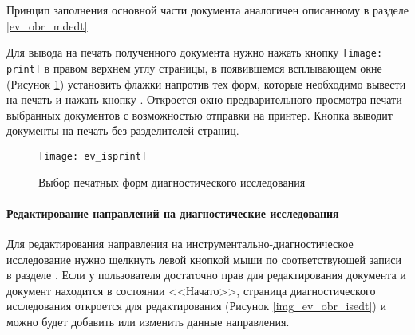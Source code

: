 {Принцип заполнения основной части документа аналогичен описанному в разделе \ref{ev_obr_mdedt}




Для вывода на печать полученного документа нужно нажать кнопку \texttt{[image: print]} в правом верхнем углу страницы, в появившемся всплывающем окне (Рисунок \ref{img_ev_isprint}) установить флажки напротив тех форм, которые необходимо вывести на печать и нажать кнопку . Откроется окно предварительного просмотра печати выбранных документов с возможностью отправки на принтер. Кнопка  выводит документы на печать без разделителей страниц.

 \begin{figure}[ht]\centering
   \texttt{[image: ev\_isprint]}
   \caption{Выбор печатных форм диагностического исследования}
   \label{img_ev_isprint}
 \end{figure}

{ 
\paragraph{Редактирование направлений на диагностические исследования} \label{ev_obr_isedt}

Для редактирования направления на инструментально-диагностическое исследование нужно щелкнуть левой кнопкой мыши по соответствующей записи в разделе . Если у пользователя достаточно прав для редактирования документа и документ находится в состоянии <<Начато>>, страница диагностического исследования откроется для редактирования (Рисунок \ref{img_ev_obr_isedt}) и можно будет добавить или изменить данные направления.

}}
